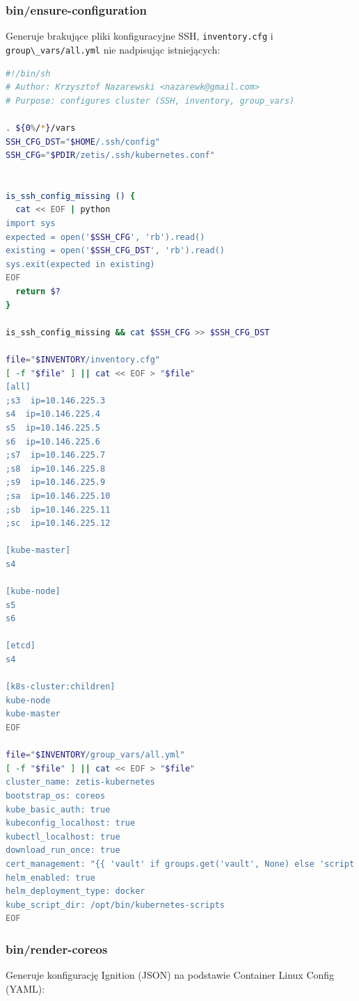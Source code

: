 \documentclass[a4paper,12pt,twoside,openany]{report}
\newcommand{\passthrough}[1]{#1}
\begin{document}
\hypertarget{binensure-configuration}{%
\subsubsection{bin/ensure-configuration}\label{binensure-configuration}}

Generuje brakujące pliki konfiguracyjne SSH,
\passthrough{\lstinline!inventory.cfg!} i
\passthrough{\lstinline!group\_vars/all.yml!} nie nadpisując
istniejących:

\begin{lstlisting}[language=bash]
#!/bin/sh
# Author: Krzysztof Nazarewski <nazarewk@gmail.com>
# Purpose: configures cluster (SSH, inventory, group_vars)

. ${0%/*}/vars
SSH_CFG_DST="$HOME/.ssh/config"
SSH_CFG="$PDIR/zetis/.ssh/kubernetes.conf"


is_ssh_config_missing () {
  cat << EOF | python
import sys
expected = open('$SSH_CFG', 'rb').read()
existing = open('$SSH_CFG_DST', 'rb').read()
sys.exit(expected in existing)
EOF
  return $?
}

is_ssh_config_missing && cat $SSH_CFG >> $SSH_CFG_DST

file="$INVENTORY/inventory.cfg"
[ -f "$file" ] || cat << EOF > "$file"
[all]
;s3  ip=10.146.225.3
s4  ip=10.146.225.4
s5  ip=10.146.225.5
s6  ip=10.146.225.6
;s7  ip=10.146.225.7
;s8  ip=10.146.225.8
;s9  ip=10.146.225.9
;sa  ip=10.146.225.10
;sb  ip=10.146.225.11
;sc  ip=10.146.225.12

[kube-master]
s4

[kube-node]
s5
s6

[etcd]
s4

[k8s-cluster:children]
kube-node
kube-master
EOF

file="$INVENTORY/group_vars/all.yml"
[ -f "$file" ] || cat << EOF > "$file"
cluster_name: zetis-kubernetes
bootstrap_os: coreos
kube_basic_auth: true
kubeconfig_localhost: true
kubectl_localhost: true
download_run_once: true
cert_management: "{{ 'vault' if groups.get('vault', None) else 'script' }}"
helm_enabled: true
helm_deployment_type: docker
kube_script_dir: /opt/bin/kubernetes-scripts
EOF
\end{lstlisting}

\hypertarget{binrender-coreos}{%
\subsubsection{bin/render-coreos}\label{binrender-coreos}}

Generuje konfigurację Ignition (JSON) na podstawie Container Linux
Config (YAML):
\end{document}
